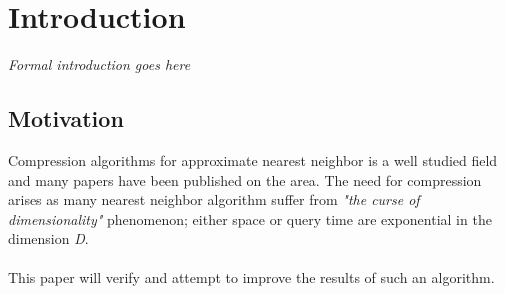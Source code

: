 \section{Introduction}
\label{introduction}
\textit{Formal introduction goes here}

\subsection{Motivation} %
Compression algorithms for approximate nearest neighbor is a well studied field and many papers have been published on the area. The need for compression arises as many nearest neighbor algorithm suffer from \textit{"the curse of dimensionality"} phenomenon; either space or query time are exponential in the dimension \textit{D}\cite{ilya15}. %
\\
\\
This paper will verify and attempt to improve the results of such an algorithm. 
